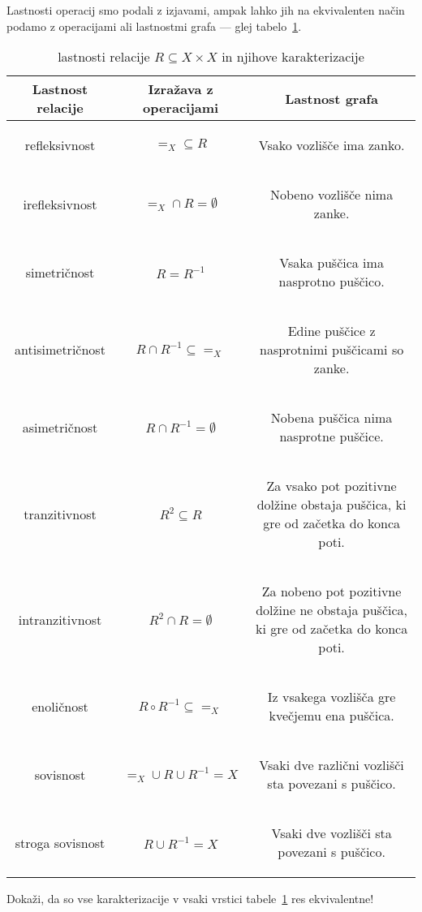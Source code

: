 		Lastnosti operacij smo podali z izjavami, ampak lahko jih na ekvivalenten način podamo z operacijami ali lastnostmi grafa --- glej tabelo~\ref{TABELA: lastnosti relacije}.
		
		\begin{table}[!ht]
			\centering
			\newcommand{\opis}[1]{\begin{minipage}{0.45\textwidth}\begin{center}{#1}\end{center}\end{minipage}}
			\def\arraystretch{3}
			\begin{tabular}{|ccc|}
				\hline
				\textbf{Lastnost relacije} & \textbf{Izražava z operacijami} & \textbf{Lastnost grafa} \\
				\hline
				refleksivnost & $=_X \subseteq R$ & \opis{Vsako vozlišče ima zanko.} \\
				irefleksivnost & $=_X \cap R = \emptyset$ & \opis{Nobeno vozlišče nima zanke.} \\
				simetričnost & $R = R^{-1}$ & \opis{Vsaka puščica ima nasprotno puščico.} \\
				antisimetričnost & $R \cap R^{-1} \subseteq =_X$ & \opis{Edine puščice z nasprotnimi puščicami so zanke.} \\
				asimetričnost & $R \cap R^{-1} = \emptyset$ & \opis{Nobena puščica nima nasprotne puščice.} \\
				tranzitivnost & $R^2 \subseteq R$ & \opis{Za vsako pot pozitivne dolžine obstaja puščica, ki gre od začetka do konca poti.} \\
				intranzitivnost & $R^2 \cap R = \emptyset$ & \opis{Za nobeno pot pozitivne dolžine ne obstaja puščica, ki gre od začetka do konca poti.} \\
				enoličnost & $R \circ R^{-1} \subseteq =_X$ & \opis{Iz vsakega vozlišča gre kvečjemu ena puščica.} \\
				sovisnost & $=_X \cup R \cup R^{-1} = X$ & \opis{Vsaki dve različni vozlišči sta povezani s puščico.} \\
				stroga sovisnost & $R \cup R^{-1} = X$ & \opis{Vsaki dve vozlišči sta povezani s puščico.} \\
				\hline
			\end{tabular}
			\caption{lastnosti relacije $R \subseteq X \times X$ in njihove karakterizacije}\label{TABELA: lastnosti relacije}
		\end{table}
		
		\begin{vaja}
			Dokaži, da so vse karakterizacije v vsaki vrstici tabele~\ref{TABELA: lastnosti relacije} res ekvivalentne!
		\end{vaja}
	
